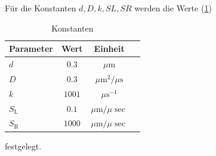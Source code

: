 Für die Konstanten  $d, D, k, SL, SR$ werden die Werte (\cref{t:const})
\begin{table}
	\centering
	\caption{Konstanten}
	\label{t:const}
	\begin{tabular}{lccc}
		\toprule
		
		Parameter& Wert &Einheit   \\
		\midrule
		$d$	& $0.3$ & $\si{\mu\meter}$    \\
		
		$D$ & $0.3$	&  $\si{\mu\square\m\per \mu \s}$  \\
		
		$k$ & $1001$	& $\si{\mu\second^{-1}}$  \\
		
		$S_\mathrm{L}$ 	& $0.1$ & $\si{\mu\m\per\mu\sec}$ \\
		
		$S_\mathrm{R}$ 	&$1000$ &  $\si{\mu\m\per\mu\sec}$  \\
		\bottomrule
		
	\end{tabular}
	
\end{table} 
festgelegt.

